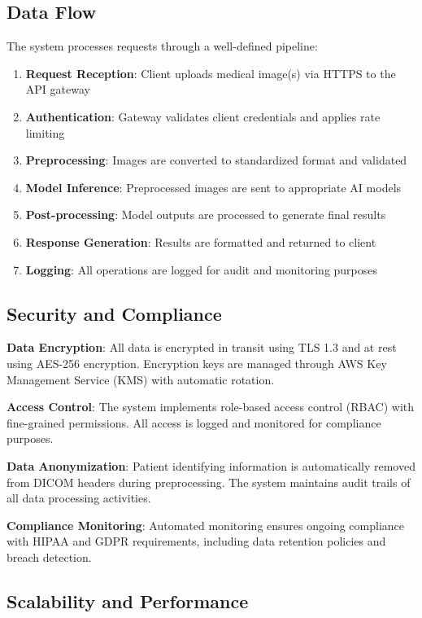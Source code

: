 \documentclass[12pt,a4paper]{article}
\begin{document}
\subsection{Data Flow}

The system processes requests through a well-defined pipeline:

\begin{enumerate}
    \item \textbf{Request Reception}: Client uploads medical image(s) via HTTPS to the API gateway
    \item \textbf{Authentication}: Gateway validates client credentials and applies rate limiting
    \item \textbf{Preprocessing}: Images are converted to standardized format and validated
    \item \textbf{Model Inference}: Preprocessed images are sent to appropriate AI models
    \item \textbf{Post-processing}: Model outputs are processed to generate final results
    \item \textbf{Response Generation}: Results are formatted and returned to client
    \item \textbf{Logging}: All operations are logged for audit and monitoring purposes
\end{enumerate}

\subsection{Security and Compliance}

\textbf{Data Encryption}: All data is encrypted in transit using TLS 1.3 and at rest using AES-256 encryption. Encryption keys are managed through AWS Key Management Service (KMS) with automatic rotation.

\textbf{Access Control}: The system implements role-based access control (RBAC) with fine-grained permissions. All access is logged and monitored for compliance purposes.

\textbf{Data Anonymization}: Patient identifying information is automatically removed from DICOM headers during preprocessing. The system maintains audit trails of all data processing activities.

\textbf{Compliance Monitoring}: Automated monitoring ensures ongoing compliance with HIPAA and GDPR requirements, including data retention policies and breach detection.

\subsection{Scalability and Performance}
\end{document}
